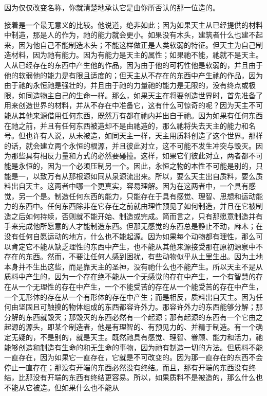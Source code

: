 \par

因为仅仅改变名称，你就清楚地承认它是由你所否认的那一位造的。\par

接着是一个最无意义的比较。他说道，绝非如此；因为如果天主从已经提供的材料中制造，那是人的作为，祂的能力就会更小。如果没有木头，建筑者什么也建不起来，因为他自己不能制造木头；不能这样做正是人类软弱的特征。但天主为自己制造材料，因为祂有能力。因为有能力是天主的属性；如果祂不能，祂就不是天主。人从已经存在的东西中产生他的作品，因为由于他的可朽性他是软弱的，并且由于他的软弱他的能力是有限且适度的；但天主从不存在的东西中产生祂的作品，因为由于祂的永恒祂是强壮的，并且由于祂的力量祂的能力是无限的，没有终点或极限，如同造物主自己的生命一样。那么，如果天主在将要创造世界时，首先准备了用来创造世界的材料，并从不存在中准备它，这有什么可惊奇的呢？因为天主不可能从其他来源借用任何东西，既然万有都在祂内并出自于祂。因为如果有任何东西在祂之前，并且有任何东西被造却不是由祂造的，那么祂将失去天主的能力和名号。但也许有人说，从未被造，如同天主一样，天主用质料创造了这个世界。那样的话，就会建立两个永恒的根源，并且彼此对立，这不可能不发生冲突与毁灭。因为那些具有相反力量和方式的必然要碰撞。这样，如果它们彼此对立，两者都不可能是永恒的，因为一个必须压制另一个。因此，永恒之物的本性不可能是别的，只能是一，以致万有从那根源如同从泉源流出来。所以，要么天主出自质料，要么质料出自天主。这两者中哪一个更真实，容易理解。因为在这两者中，一个具有感觉，另一个是。制造任何东西的能力，只能存在于具有感觉、理智、思想和运动能力的东西中。任何东西除非在它存在之前就由理性预见了如何制造，并且在它被制造之后如何持续，否则就不能开始、制造或完成。简而言之，只有那愿意制造并有手来完成他所愿意的人才能制造东西。但那无感觉的东西总是静止不动，麻木；在没有任何自愿运动的地方，什么也不能起源。因为如果每个动物都有理性，那么可以肯定它不能从缺乏理性的东西中产生，也不能从其他来源接受那在原初源泉中不存在的东西。然而，不要让任何人感到困扰，有些动物似乎从土里生出。因为土地本身并不生出这些，而是靠天主的圣神，没有祂什么也不能产生。所以天主不是从质料中产生的，因为一个存在绝不能从一个无感觉的存在中产生，一个有智慧的存在从一个无理性的存在中产生，一个不能受苦的存在从一个能受苦的存在中产生，一个无形体的存在从一个有形体的存在中产生；而是相反，质料出自天主。因为任何由坚固且可触摸的物体组成的东西都容许外力。那容许外力的东西能够分解；那分解的东西就毁灭；那毁灭的东西必然有一个起源；那有起源的东西有一个它由之起源的源头，即某个制造者，他是有理智的、有预见力的、并精于制造。有一个确定无疑的，不是别的，就是天主。既然祂具有感觉、理智、眷顾、能力和活力，祂能够创造和制造有生命的和无生命的事物，因为祂有制造一切的方法。但质料不能一直存在，因为如果它一直存在，它就是不可改变的。因为那一直存在的东西不会停止一直存在；那没有开端的东西必然没有终结。而且，那有开端的东西没有终结，比那没有开端的东西有终结更容易。所以，如果质料不是被造的，那么什么也不能从它被造。但如果什么也不能从